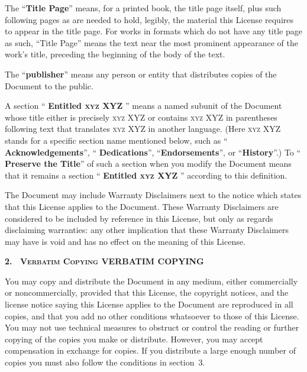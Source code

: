 The \enquote{\textbf{Title Page}} means, for a printed book,
the title page itself, plus such following pages as are
needed to hold, legibly, the material this License requires
to appear in the title page. For works in formats which do
not have any title page as such, \enquote{Title Page} means
the text near the most prominent appearance of the work's
title, preceding the beginning of the body of the text.

The \enquote{\textbf{publisher}} means any person or entity
that distributes copies of the Document to the public.

A section \enquote{%
  \textbf{%
    Entitled
    \ifgfdl@sc
      \textsc{xyz}
    \else
      XYZ
    \fi
  }%
} means a named subunit of the Document whose title either
is precisely
\ifgfdl@sc
  \textsc{xyz}
\else
  XYZ
\fi
or contains
\ifgfdl@sc
  \textsc{xyz}
\else
  XYZ
\fi
in parentheses following text that translates
\ifgfdl@sc
  \textsc{xyz}
\else
  XYZ
\fi
in another language. (Here
\ifgfdl@sc
  \textsc{xyz}
\else
  XYZ
\fi
stands for a specific section name mentioned below, such as
\enquote{%
  \textbf{Acknowledgements}}, \enquote{\textbf{%
    Dedications}}, \enquote{\textbf{Endorsements}}, or
\enquote{\textbf{History}}.) To \enquote{\textbf{%
    Preserve the Title}} of such a section when you modify
the Document means that it remains a section \enquote{%
  \textbf{Entitled
    \ifgfdl@sc
      \textsc{xyz}
    \else
      XYZ
    \fi
  }%
} according to this definition.

The Document may include Warranty Disclaimers next to the
notice which states that this License applies to the
Document. These Warranty Disclaimers are considered to be
included by reference in this License, but only as regards
disclaiming warranties: any other implication that these
Warranty Disclaimers may have is void and has no effect on
the meaning of this License.

\medskip
\begin{center}
  \textbf{%
    \Large 2.\
    \ifgfdl@sc
      \textsc{Verbatim Copying}%
    \else
      VERBATIM COPYING%
    \fi
  }%
\end{center}

\noindent
You may copy and distribute the Document in any medium,
either commercially or noncommercially, provided that this
License, the copyright notices, and the license notice
saying this License applies to the Document are reproduced
in all copies, and that you add no other conditions
whatsoever to those of this License. You may not use
technical measures to obstruct or control the reading or
further copying of the copies you make or distribute.
However, you may accept compensation in exchange for copies.
If you distribute a large enough number of copies you must
also follow the conditions in section~3.

